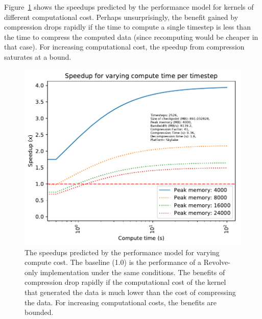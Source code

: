 \documentclass[conference]{IEEEtran}
\begin{document}
Figure~\ref{fig:varying_compute} shows the speedups predicted by the
performance model for kernels of different computational cost. Perhaps
unsurprisingly, the benefit gained by compression drops rapidly if the
time to compute a single timestep is less than the time to compress
the computed data (since recomputing would be cheaper in that case). For
increasing computational cost, the speedup from compression saturates
at a bound. 
\begin{figure}
\begin{center}
\includegraphics[width=\linewidth]{images/varying-compute.pdf}
\end{center}
\caption{The speedups predicted by the performance model for varying
  compute cost. The baseline
(1.0) is the performance of a Revolve-only implementation under the
same conditions. The benefits of compression drop rapidly if the
computational cost of the kernel that generated the data is much lower
than the cost of compressing the data. For increasing computational
costs, the benefits are bounded.}
\label{fig:varying_compute}
\end{figure}
\end{document}
